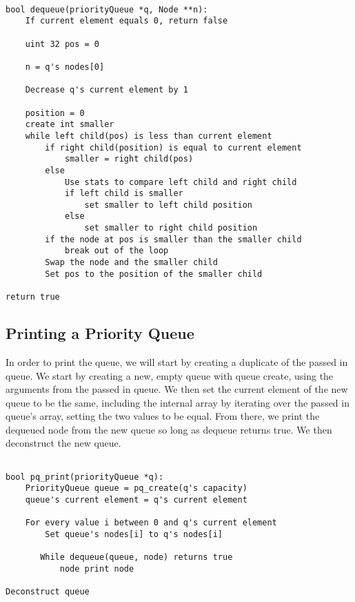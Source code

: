\documentclass[11pt]{article}
\begin{document}
\begin{verbatim}

bool dequeue(priorityQueue *q, Node **n):
    If current element equals 0, return false

    uint 32 pos = 0

    n = q's nodes[0]

    Decrease q's current element by 1

    position = 0
    create int smaller
    while left child(pos) is less than current element
        if right child(position) is equal to current element
            smaller = right child(pos)
        else
            Use stats to compare left child and right child
            if left child is smaller
                set smaller to left child position
            else
                set smaller to right child position
        if the node at pos is smaller than the smaller child
            break out of the loop
        Swap the node and the smaller child
        Set pos to the position of the smaller child

return true

\end{verbatim}

\subsection{Printing a Priority Queue}

In order to print the queue, we will start by creating a duplicate of the passed in queue. We start by creating a new, empty queue with queue create, using the arguments from the passed in queue. We then set the current element of the new queue to be the same, including the internal array by iterating over the passed in queue's array, setting the two values to be equal. From there, we print the dequeued node from the new queue so long as dequeue returns true. We then deconstruct the new queue.

\begin{verbatim}

bool pq_print(priorityQueue *q):
    PriorityQueue queue = pq_create(q's capacity)
    queue's current element = q's current element

    For every value i between 0 and q's current element
        Set queue's nodes[i] to q's nodes[i]

       While dequeue(queue, node) returns true
           node print node

Deconstruct queue

\end{verbatim}
\end{document}

